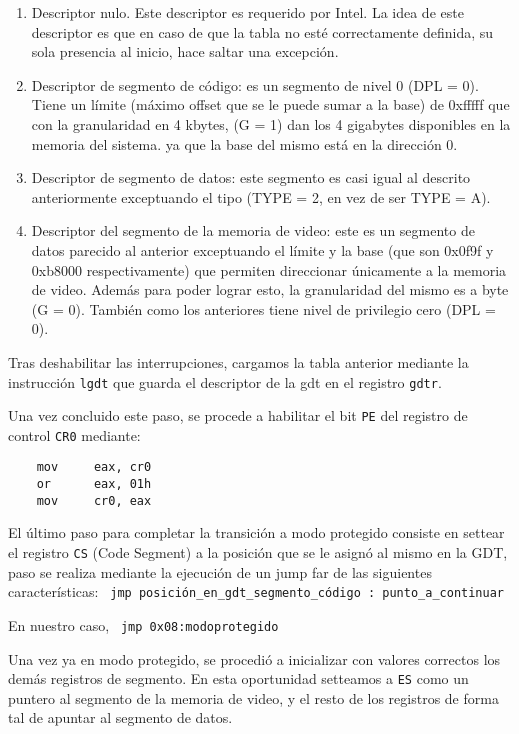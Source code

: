 \begin{enumerate}
\item Descriptor nulo. Este descriptor es requerido por Intel. La idea de este descriptor es que en caso de que la tabla no esté correctamente definida, su sola presencia al inicio, hace saltar una excepción. %

\item Descriptor de segmento de código: es un segmento de nivel 0 (DPL = 0). Tiene un límite (máximo offset que se le puede sumar a la base) de 0xfffff que con la granularidad en 4 kbytes, (G = 1) dan los 4 gigabytes disponibles en la memoria del sistema. ya que la base del mismo está en la dirección 0.

\item Descriptor de segmento de datos: este segmento es casi igual al descrito anteriormente exceptuando el tipo (TYPE = 2, en vez de ser TYPE = A).

\item Descriptor del segmento de la memoria de video: este es un segmento de datos parecido al anterior exceptuando el límite y la base (que son 0x0f9f y 0xb8000 respectivamente) que permiten direccionar únicamente a la memoria de video. Además para poder lograr esto, la granularidad del mismo es a byte (G = 0). También como los anteriores tiene nivel de privilegio cero (DPL = 0).
\end{enumerate}

Tras deshabilitar las interrupciones, cargamos la tabla anterior mediante la instrucción \texttt{lgdt} que guarda el descriptor de la gdt en el registro \texttt{gdtr}.

Una vez concluido este paso, se procede a habilitar el bit \texttt{PE} del registro de control \texttt{CR0} mediante:

\begin{verbatim}
	mov     eax, cr0
	or      eax, 01h
	mov     cr0, eax
\end{verbatim}

El último paso para completar la transición a modo protegido consiste en settear el registro \texttt{CS} (Code Segment) a la posición que se le asignó al mismo en la GDT, paso se realiza mediante la ejecución de un jump far de las siguientes características: 
\verb= jmp posición_en_gdt_segmento_código : punto_a_continuar=

En nuestro caso, 
\verb= jmp 0x08:modoprotegido =

Una vez ya en modo protegido, se procedió a inicializar con valores correctos los demás registros de segmento. En esta oportunidad setteamos a \texttt{ES} como un puntero al segmento de la memoria de video, y el resto de los registros de forma tal de apuntar al segmento de datos. 

